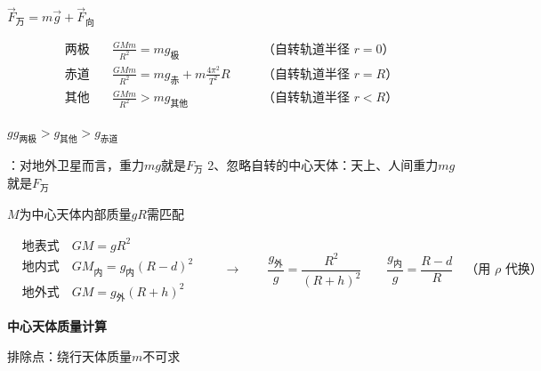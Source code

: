 $\vec{F}_{\text{万}}=m\vec{g}+\vec{F}_{\text{向}}$

\[
\begin{aligned}
\text{两极}\quad & \frac{GMm}{R^{2}}=mg_{\text{极}} & & \quad\text{（自转轨道半径 $r=0$）}\\[4pt]
\text{赤道}\quad & \frac{GMm}{R^{2}}=mg_{\text{赤}}+m\frac{4\pi^{2}}{T^{2}}R & & \quad\text{（自转轨道半径 $r=R$）}\\[4pt]
\text{其他}\quad & \frac{GMm}{R^{2}}>mg_{\text{其他}} & & \quad\text{（自转轨道半径 $r<R$）}
\end{aligned}
\]

$g$\quad $g_{\text{两极}}>g_{\text{其他}}>g_{\text{赤道}}$\hfill{}

：对地外卫星而言，重力$mg$就是$F_{\text{万}}$
2、忽略自转的中心天体：天上、人间重力$mg$就是$F_{\text{万}}$\quad{}%

$M$为中心天体内部质量\quad $gR$需匹配

\[
\begin{aligned}
&\text{地表式}\quad GM=gR^{2}\\
&\text{地内式}\quad GM_{\text{内}}=g_{\text{内}}(R-d)^{2}\\
&\text{地外式}\quad GM=g_{\text{外}}(R+h)^{2}
\end{aligned}
\qquad\to\qquad
\frac{g_{\text{外}}}{g}=\frac{R^{2}}{(R+h)^{2}}\quad\quad
\frac{g_{\text{内}}}{g}=\frac{R-d}{R}\quad\text{（用 $\rho$ 代换）}
\]

\textbf{中心天体质量计算}

排除点：绕行天体质量$m$不可求\quad{}%

